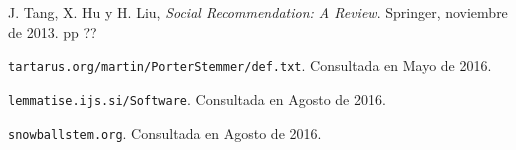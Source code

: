 \documentclass[11pt, spanish]{report}
\begin{document}
\begin{thebibliography}{56}
  			J. Tang, X. Hu y H. Liu, 
  			\textit{Social Recommendation: A Review}. 
  			Springer, 
  			noviembre de 2013. 
  			pp ??
  		
  			\texttt{tartarus.org/martin/PorterStemmer/def.txt}.
  			Consultada en Mayo de 2016.
  			
  			\texttt{lemmatise.ijs.si/Software}.
  			Consultada en Agosto de 2016.
  	
  			\texttt{snowballstem.org}.
  			Consultada en Agosto de 2016.
  			
  			
	\end{thebibliography}
		
	\appendix
\end{document}
